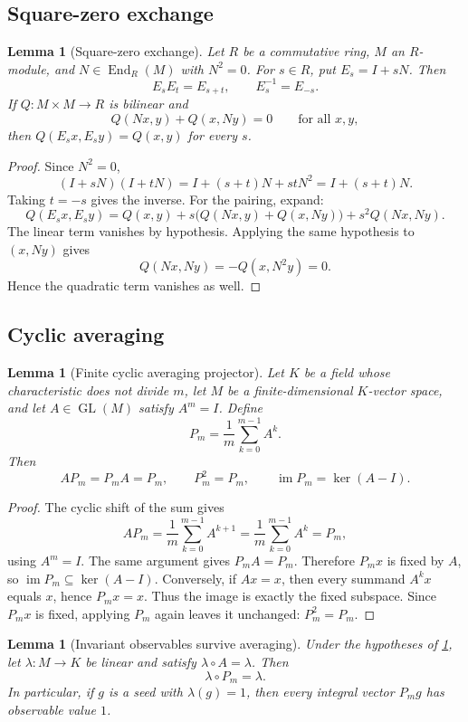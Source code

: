 \documentclass[11pt,reqno]{amsart}
\numberwithin{equation}{section}
\newcommand{\im}{\operatorname{im}}
\newtheorem{lemma}[theorem]{Lemma}
\theoremstyle{definition}
\begin{document}
\subsection{Square-zero exchange}

\begin{lemma}[Square-zero exchange]\label{lem:square-zero-exchange}
Let $R$ be a commutative ring, $M$ an $R$-module, and $N\in\operatorname{End}_R(M)$ with $N^2=0$. For $s\in R$, put $E_s=I+sN$. Then
\[
E_sE_t=E_{s+t},
\qquad
E_s^{-1}=E_{-s}.
\]
If $Q:M\times M\to R$ is bilinear and
\[
Q(Nx,y)+Q(x,Ny)=0
\qquad\text{for all }x,y,
\]
then $Q(E_sx,E_sy)=Q(x,y)$ for every $s$.
\end{lemma}

\begin{proof}
Since $N^2=0$,
\[
(I+sN)(I+tN)=I+(s+t)N+stN^2=I+(s+t)N.
\]
Taking $t=-s$ gives the inverse. For the pairing, expand:
\[
Q(E_sx,E_sy)=Q(x,y)+s\bigl(Q(Nx,y)+Q(x,Ny)\bigr)+s^2Q(Nx,Ny).
\]
The linear term vanishes by hypothesis. Applying the same hypothesis to $(x,Ny)$ gives
\[
Q(Nx,Ny)=-Q(x,N^2y)=0.
\]
Hence the quadratic term vanishes as well.
\end{proof}

\subsection{Cyclic averaging}

\begin{lemma}[Finite cyclic averaging projector]\label{lem:cyclic-projector}
Let $K$ be a field whose characteristic does not divide $m$, let $M$ be a finite-dimensional $K$-vector space, and let $A\in\operatorname{GL}(M)$ satisfy $A^m=I$. Define
\[
P_m=\frac1m\sum_{k=0}^{m-1}A^k.
\]
Then
\[
AP_m=P_mA=P_m,
\qquad
P_m^2=P_m,
\qquad
\im P_m=\ker(A-I).
\]
\end{lemma}

\begin{proof}
The cyclic shift of the sum gives
\[
AP_m=\frac1m\sum_{k=0}^{m-1}A^{k+1}
=\frac1m\sum_{k=0}^{m-1}A^k=P_m,
\]
using $A^m=I$. The same argument gives $P_mA=P_m$. Therefore $P_mx$ is fixed by $A$, so $\im P_m\subseteq\ker(A-I)$. Conversely, if $Ax=x$, then every summand $A^kx$ equals $x$, hence $P_mx=x$. Thus the image is exactly the fixed subspace. Since $P_mx$ is fixed, applying $P_m$ again leaves it unchanged: $P_m^2=P_m$.
\end{proof}

\begin{lemma}[Invariant observables survive averaging]\label{lem:observable}
Under the hypotheses of \cref{lem:cyclic-projector}, let $\lambda:M\to K$ be linear and satisfy $\lambda\circ A=\lambda$. Then
\[
\lambda\circ P_m=\lambda.
\]
In particular, if $g$ is a seed with $\lambda(g)=1$, then every integral vector $P_mg$ has observable value $1$.
\end{lemma}
\end{document}
